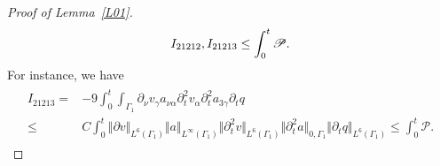 \documentclass[10pt,reqno]{amsart}
\theoremstyle{plain}
\theoremstyle{definition}
\numberwithin{equation}{section}
\newcommand{\ccP}{\mathscr{P}}
\newcommand{\al}{\alpha}
\newcommand{\ga}{\gamma}
\newcommand{\Ga}{\Gamma}
\newcommand{\norm}[1]{\Vert#1\Vert}
\begin{document}
\begin{proof}[Proof of Lemma~\ref{L01}]
\begin{align}
\begin{split}
I_{21212},
I_{21213}\le 
\int_0^t  \ccP
   .
\end{split}
\notag
\end{align}
For instance, we have
\begin{align}
\begin{split}
I_{21213}
=&
-9 \int_0^t \int_{\Ga_1}  \partial_\nu v_\ga a_{\nu \al} \partial^2_t v_\al \partial^2_t a_{3 \ga} \partial_t q
\\
\leq &
C
\int_0^t
 \norm{ \partial v}_{L^6(\Ga_1)}
 \norm{ a}_{L^\infty(\Ga_1)}
  \norm{ \partial^2_t v}_{L^6(\Ga_1)}
 \norm{ \partial^2_t a}_{0,\Ga_1}
  \norm{ \partial_t q}_{L^6(\Ga_1)}   
  \leq 
\int_0^t  \ccP.
\end{split}
\label{estimate_I_21213}
\end{align}
%
%

\end{proof}
\end{document}
